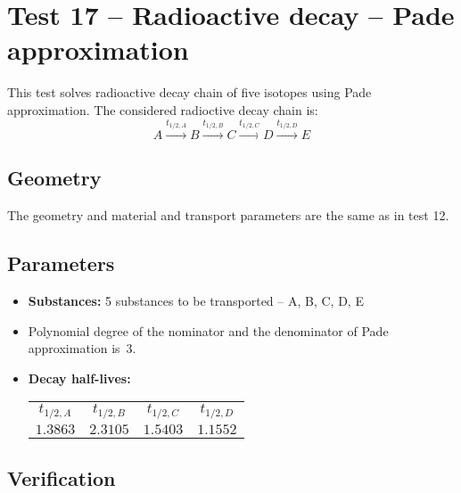 

\section{Test 17 -- Radioactive decay -- Pade approximation}
This test solves radioactive decay chain of five isotopes using Pade approximation.
The considered radioctive decay chain is:
\[
 A\xrightarrow{t_{1/2,A}}B\xrightarrow{t_{1/2,B}}C\xrightarrow{t_{1/2,C}}D\xrightarrow{t_{1/2,D}}E
\]

\subsection*{Geometry}
The geometry and material and transport parameters are the same as in test 12.


\subsection*{Parameters}
\begin{itemize}
  \item \textbf{Substances:} 5 substances to be transported -- A, B, C, D, E
  \item Polynomial degree of the nominator and the denominator of Pade approximation is~3.
  \item \textbf{Decay half-lives:} 
    \begin{tabular}[c]{|c|c|c|c|}
      \hline
      $t_{1/2,A}$ & $t_{1/2,B}$  & $t_{1/2,C}$ & $t_{1/2,D}$\\[4pt]
      $1.3863$ & $2.3105$ & $1.5403$ & $1.1552$\\[4pt]
      \hline
    \end{tabular}
\end{itemize}

\subsection*{Verification}


